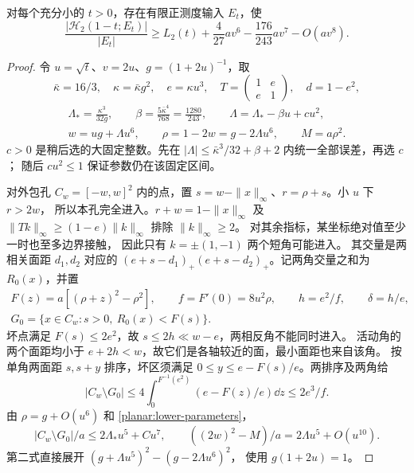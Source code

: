 \begin{proposition}[七阶匹配下界]\label{planar:lower}
对每个充分小的 \(t>0\)，存在有限正测度输入 \(E_t\)，使
\[
 \frac{|\mathcal H_2(1-t;E_t)|}{|E_t|}
 \ge L_2(t)+\frac4{27}av^6-\frac{176}{243}av^7-O(av^8).
\]
\end{proposition}
\begin{proof}
令 \(u=\sqrt t\)、\(v=2u\)、\(g=(1+2u)^{-1}\)，取
\[
 \bar\kappa=16/3,\quad \kappa=\bar\kappa g^2,\quad e=\kappa u^3,
 \quad T=\begin{pmatrix}1&e\\e&1\end{pmatrix},\quad d=1-e^2,
\]
\begin{equation}\label{planar:lower-parameters}
 \begin{gathered}
 \Lambda_*=\frac{\kappa^3}{32g},\qquad
 \beta=\frac{5\bar\kappa^4}{768}=\frac{1280}{243},\qquad
 \Lambda=\Lambda_*-\beta u+c u^2,\\
 w=ug+\Lambda u^6,\qquad \rho=1-2w=g-2\Lambda u^6,\qquad M=a\rho^2.
 \end{gathered}
\end{equation}
\(c>0\) 是稍后选的大固定整数。先在
\(|\Lambda|\le\bar\kappa^3/32+\beta+2\) 内统一全部误差，再选 \(c\)；
随后 \(cu^2\le1\) 保证参数仍在该固定区间。

对外包孔 \(C_w=[-w,w]^2\) 内的点，置
\(s=w-\|x\|_\infty\)、\(r=\rho+s\)。小 \(u\) 下 \(r>2w\)，
所以本孔完全进入。\(r+w=1-\|x\|_\infty\) 及
\(\|Tk\|_\infty\ge(1-e)\|k\|_\infty\) 排除 \(\|k\|_\infty\ge2\)。
对其余指标，某坐标绝对值至少一时也至多边界接触，
因此只有 \(k=\pm(1,-1)\) 两个短角可能进入。
其交量是两相关面距 \(d_1,d_2\) 对应的
\((e+s-d_1)_+(e+s-d_2)_+\)。记两角交量之和为 \(R_0(x)\)，并置
\[
 \begin{gathered}
 F(z)=a[(\rho+z)^2-\rho^2],\qquad f=F'(0)=8u^2\rho,\qquad
 h=e^2/f,\qquad \delta=h/e,\\
 G_0=\{x\in C_w:s>0,\ R_0(x)<F(s)\}.
 \end{gathered}
\]
坏点满足 \(F(s)\le2e^2\)，故 \(s\le2h\ll w-e\)，两相反角不能同时进入。
活动角的两个面距均小于 \(e+2h<w\)，故它们是各轴较近的面，最小面距也来自该角。
按单角两面距 \(s,s+y\) 排序，坏区须满足
\(0\le y\le e-F(s)/e\)。两排序及两角给
\[
 |C_w\setminus G_0|\le
 4\int_0^{F^{-1}(e^2)}(e-F(z)/e)\dd z\le 2e^3/f.
\]
由 \(\rho=g+O(u^6)\) 和 \eqref{planar:lower-parameters}，
\begin{equation}\label{planar:lower-budget}
 |C_w\setminus G_0|/a\le2\Lambda_*u^5+Cu^7,\qquad
 ((2w)^2-M)/a=2\Lambda u^5+O(u^{10}).
\end{equation}
第二式直接展开 \((g+\Lambda u^5)^2-(g-2\Lambda u^6)^2\)，
使用 \(g(1+2u)=1\)。


\end{proof}
